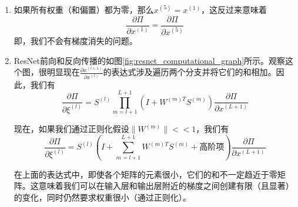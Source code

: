 \begin{enumerate}
\item 如果所有权重（和偏置）都为零，那么$x^{(5)} = x^{(1)}$，这反过来意味着
\begin{equation}
\frac{\partial\Pi}{\partial x^{(1)}} = \frac{\partial\Pi}{\partial x^{(5)}}
\end{equation}
即，我们不会有梯度消失的问题。

\item ResNet前向和反向传播的如图\ref{fig:resnet_computational_graph}所示。观察这个图，很明显现在$\frac{\partial x^{(l+1)}}{\partial x^{(l)}}$的表达式涉及遍历两个分支并将它们的和相加。因此，我们有
\begin{equation}
\frac{\partial\Pi}{\partial\xi^{(l)}} = S^{(l)} \prod_{m=l+1}^{L+1} \left(I + W^{(m)T} S^{(m)}\right) \frac{\partial\Pi}{\partial x^{(L+1)}}
\label{eq:resnet_gradient}
\end{equation}

现在，如果我们通过正则化假设$\|W^{(m)}\| << 1$，我们有
\begin{equation}
\frac{\partial\Pi}{\partial\xi^{(l)}} = S^{(l)} \left(I + \sum_{m=l+1}^{L+1} W^{(m)T} S^{(m)} + \text{高阶项}\right) \frac{\partial\Pi}{\partial x^{(L+1)}}
\label{eq:resnet_gradient_approximation}
\end{equation}

在上面的表达式中，即使各个矩阵的元素很小，它们的和不一定趋近于零矩阵。这意味着我们可以在输入层和输出层附近的梯度之间创建有限（且显著）的变化，同时仍然要求权重很小（通过正则化）。
\end{enumerate}

